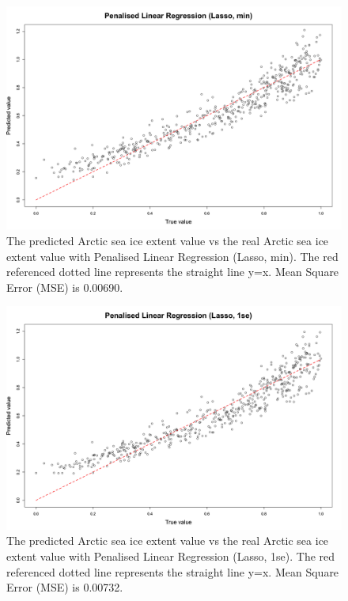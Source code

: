 \begin{figure}[htbp]
\centering
\includegraphics[width = 1.0\textwidth]{Figure/4.2.2-PLR-min.png}
\caption{The predicted Arctic sea ice extent value vs the real Arctic sea ice extent value with Penalised Linear Regression (Lasso, min). The red referenced dotted line represents the straight line y=x. Mean Square Error (MSE) is 0.00690.}
\label{4.2.2-PLR-min}
\end{figure}


\begin{figure}[htbp]
\centering
\includegraphics[width = 1.0\textwidth]{Figure/4.2.2-PLR-1se.png}
\caption{The predicted Arctic sea ice extent value vs the real Arctic sea ice extent value with Penalised Linear Regression (Lasso, 1se). The red referenced dotted line represents the straight line y=x. Mean Square Error (MSE) is 0.00732.}
\label{4.2.2-PLR-1se}
\end{figure}



